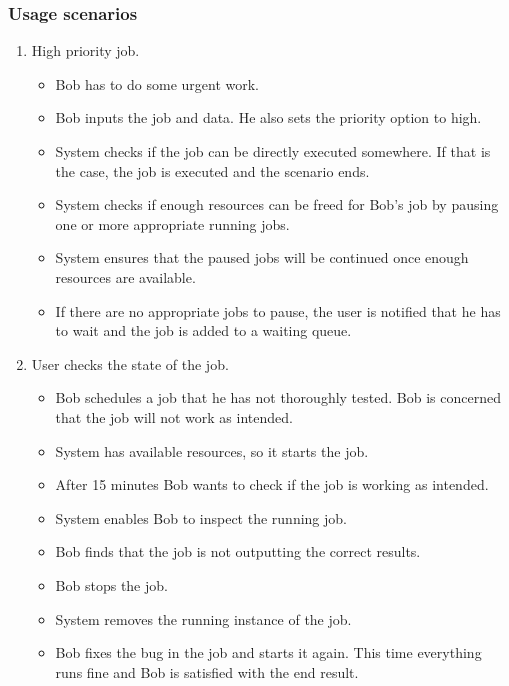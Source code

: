 \subsubsection{Usage scenarios}
\begin{enumerate}
  \item High priority job.
  \begin{itemize}
    \item Bob has to do some urgent work.
    \item Bob inputs the job and data. He also sets the priority option to high.
    \item System checks if the job can be directly executed somewhere.
    If that is the case, the job is executed and the scenario ends.
    \item System checks if enough resources can be freed for Bob's job by pausing one or more appropriate running jobs.
    \item System ensures that the paused jobs will be continued once enough resources are available.
    \item If there are no appropriate jobs to pause, the user is notified that he has to wait and the job is added to a waiting queue.
  \end{itemize}
  \item User checks the state of the job.
  \begin{itemize}
    \item Bob schedules a job that he has not thoroughly tested.
    Bob is concerned that the job will not work as intended.
    \item System has available resources, so it starts the job.
    \item After 15 minutes Bob wants to check if the job is working as intended.
    \item System enables Bob to inspect the running job.
    \item Bob finds that the job is not outputting the correct results.
    \item Bob stops the job.
    \item System removes the running instance of the job.
    \item Bob fixes the bug in the job and starts it again.
    This time everything runs fine and Bob is satisfied with the end result.
  \end{itemize}
\end{enumerate}

